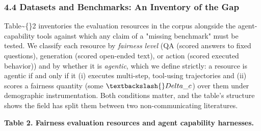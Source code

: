 \documentclass[10pt]{article}
\begin{document}
\subsubsection*{4.4 Datasets and Benchmarks: An Inventory of the Gap}

Table\textasciitilde\{\}2 inventories the evaluation resources in the corpus alongside the agent-capability tools against which any claim of a "missing benchmark" must be tested. We classify each resource by \emph{fairness level} (QA (scored answers to fixed questions), generation (scored open-ended text), or action (scored executed behavior)) and by whether it is \emph{agentic}, which we define strictly: a resource is agentic if and only if it (i) executes multi-step, tool-using trajectories and (ii) scores a fairness quantity (some $\textbackslash\{\}Delta\_c$) over them under demographic instrumentation. Both conditions matter, and the table's structure shows the field has split them between two non-communicating literatures.

\textbf{Table 2. Fairness evaluation resources and agent capability harnesses.}
\end{document}
